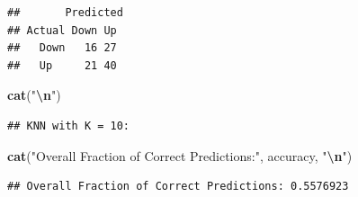 \documentclass[
]{article}
\newenvironment{Shaded}{\begin{snugshade}}{\end{snugshade}}
\newcommand{\AttributeTok}[1]{\textcolor[rgb]{0.13,0.29,0.53}{#1}}
\newcommand{\CommentTok}[1]{\textcolor[rgb]{0.56,0.35,0.01}{\textit{#1}}}
\newcommand{\DecValTok}[1]{\textcolor[rgb]{0.00,0.00,0.81}{#1}}
\newcommand{\FunctionTok}[1]{\textcolor[rgb]{0.13,0.29,0.53}{\textbf{#1}}}
\newcommand{\NormalTok}[1]{#1}
\newcommand{\OtherTok}[1]{\textcolor[rgb]{0.56,0.35,0.01}{#1}}
\newcommand{\SpecialCharTok}[1]{\textcolor[rgb]{0.81,0.36,0.00}{\textbf{#1}}}
\newcommand{\StringTok}[1]{\textcolor[rgb]{0.31,0.60,0.02}{#1}}
\begin{document}
\begin{verbatim}
##       Predicted
## Actual Down Up
##   Down   16 27
##   Up     21 40
\end{verbatim}

\begin{Shaded}
\begin{Highlighting}[]
\FunctionTok{cat}\NormalTok{(}\StringTok{"}\SpecialCharTok{\textbackslash{}n}\StringTok{"}\NormalTok{)}
\end{Highlighting}
\end{Shaded}

\begin{Shaded}
\end{Shaded}

\begin{verbatim}
## KNN with K = 10:
\end{verbatim}

\begin{Shaded}
\begin{Highlighting}[]
\FunctionTok{cat}\NormalTok{(}\StringTok{"Overall Fraction of Correct Predictions:"}\NormalTok{, accuracy, }\StringTok{"}\SpecialCharTok{\textbackslash{}n}\StringTok{"}\NormalTok{)}
\end{Highlighting}
\end{Shaded}

\begin{verbatim}
## Overall Fraction of Correct Predictions: 0.5576923
\end{verbatim}
\end{document}
